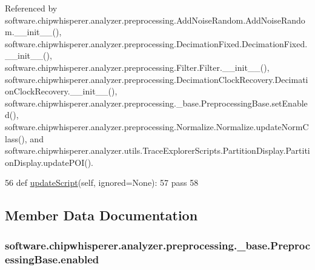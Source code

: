 Referenced by software.\+chipwhisperer.\+analyzer.\+preprocessing.\+Add\+Noise\+Random.\+Add\+Noise\+Random.\+\_\+\+\_\+init\+\_\+\+\_\+(), software.\+chipwhisperer.\+analyzer.\+preprocessing.\+Decimation\+Fixed.\+Decimation\+Fixed.\+\_\+\+\_\+init\+\_\+\+\_\+(), software.\+chipwhisperer.\+analyzer.\+preprocessing.\+Filter.\+Filter.\+\_\+\+\_\+init\+\_\+\+\_\+(), software.\+chipwhisperer.\+analyzer.\+preprocessing.\+Decimation\+Clock\+Recovery.\+Decimation\+Clock\+Recovery.\+\_\+\+\_\+init\+\_\+\+\_\+(), software.\+chipwhisperer.\+analyzer.\+preprocessing.\+\_\+base.\+Preprocessing\+Base.\+set\+Enabled(), software.\+chipwhisperer.\+analyzer.\+preprocessing.\+Normalize.\+Normalize.\+update\+Norm\+Class(), and software.\+chipwhisperer.\+analyzer.\+utils.\+Trace\+Explorer\+Scripts.\+Partition\+Display.\+Partition\+Display.\+update\+P\+O\+I().


\begin{DoxyCode}
56     \textcolor{keyword}{def }\hyperlink{classsoftware_1_1chipwhisperer_1_1analyzer_1_1preprocessing_1_1__base_1_1PreprocessingBase_a8f1add186cf310162dc2dc547ca7c673}{updateScript}(self, ignored=None):
57         \textcolor{keywordflow}{pass}
58 
\end{DoxyCode}


\subsection{Member Data Documentation}
\hypertarget{classsoftware_1_1chipwhisperer_1_1analyzer_1_1preprocessing_1_1__base_1_1PreprocessingBase_ae665d04fcffe5a72f76fb88c4e0f9aaa}{}
\subsubsection[{enabled}]{\setlength{\rightskip}{0pt plus 5cm}software.\+chipwhisperer.\+analyzer.\+preprocessing.\+\_\+base.\+Preprocessing\+Base.\+enabled}\label{classsoftware_1_1chipwhisperer_1_1analyzer_1_1preprocessing_1_1__base_1_1PreprocessingBase_ae665d04fcffe5a72f76fb88c4e0f9aaa}


